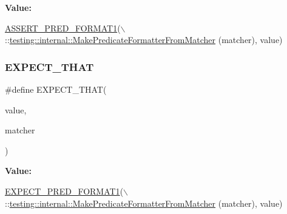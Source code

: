 {\bfseries Value\+:}
\begin{DoxyCode}
\hyperlink{gtest__pred__impl_8h_a3771ca0d1a72013aebc3d66e046491ed}{ASSERT\_PRED\_FORMAT1}(\(\backslash\)
    ::\hyperlink{namespacetesting_1_1internal_a3fd0f30ec03d577bba3e1aa13241e17d}{testing::internal::MakePredicateFormatterFromMatcher}
      (matcher), value)
\end{DoxyCode}
\mbox{\label{gmock-matchers_8h_ac31e206123aa702e1152bb2735b31409}} 
\subsubsection{\texorpdfstring{E\+X\+P\+E\+C\+T\+\_\+\+T\+H\+AT}{EXPECT\_THAT}}
{\footnotesize\ttfamily \#define E\+X\+P\+E\+C\+T\+\_\+\+T\+H\+AT(\begin{DoxyParamCaption}\item[{}]{value,  }\item[{}]{matcher }\end{DoxyParamCaption})}

{\bfseries Value\+:}
\begin{DoxyCode}
\hyperlink{gtest__pred__impl_8h_a07132aa62cf4902e50e68d0265f573b6}{EXPECT\_PRED\_FORMAT1}(\(\backslash\)
    ::\hyperlink{namespacetesting_1_1internal_a3fd0f30ec03d577bba3e1aa13241e17d}{testing::internal::MakePredicateFormatterFromMatcher}
      (matcher), value)
\end{DoxyCode}
